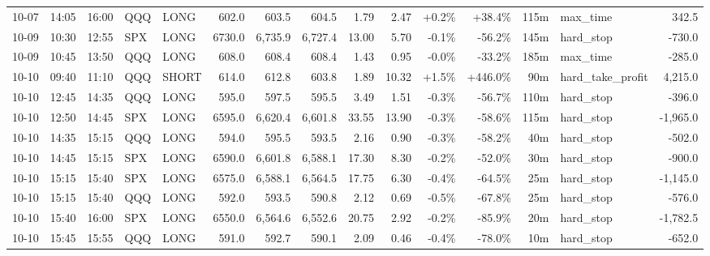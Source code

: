 \documentclass[11pt,a4paper,twoside]{article}
\begin{document}
\begin{landscape}
\begin{center}
\begin{longtable}{>{\color{txtmain}}l l l l l r r r r r r r r >{\color{txtmain}}l r}
10-07 & 14:05 & 16:00 & QQQ & LONG & 602.0 & 603.5 & 604.5 & 1.79 & 2.47 & \textcolor{wingreen}{+0.2\%} & \textcolor{wingreen}{+38.4\%} & 115m & max\_time & \textcolor{wingreen}{342.5} \\
10-09 & 10:30 & 12:55 & SPX & LONG & 6730.0 & 6,735.9 & 6,727.4 & 13.00 & 5.70 & \textcolor{lossred}{-0.1\%} & \textcolor{lossred}{-56.2\%} & 145m & hard\_stop & \textcolor{lossred}{-730.0} \\
10-09 & 10:45 & 13:50 & QQQ & LONG & 608.0 & 608.4 & 608.4 & 1.43 & 0.95 & \textcolor{lossred}{-0.0\%} & \textcolor{lossred}{-33.2\%} & 185m & max\_time & \textcolor{lossred}{-285.0} \\
10-10 & 09:40 & 11:10 & QQQ & SHORT & 614.0 & 612.8 & 603.8 & 1.89 & 10.32 & \textcolor{wingreen}{+1.5\%} & \textcolor{wingreen}{+446.0\%} & 90m & hard\_take\_profit & \textcolor{wingreen}{4,215.0} \\
10-10 & 12:45 & 14:35 & QQQ & LONG & 595.0 & 597.5 & 595.5 & 3.49 & 1.51 & \textcolor{lossred}{-0.3\%} & \textcolor{lossred}{-56.7\%} & 110m & hard\_stop & \textcolor{lossred}{-396.0} \\
10-10 & 12:50 & 14:45 & SPX & LONG & 6595.0 & 6,620.4 & 6,601.8 & 33.55 & 13.90 & \textcolor{lossred}{-0.3\%} & \textcolor{lossred}{-58.6\%} & 115m & hard\_stop & \textcolor{lossred}{-1,965.0} \\
10-10 & 14:35 & 15:15 & QQQ & LONG & 594.0 & 595.5 & 593.5 & 2.16 & 0.90 & \textcolor{lossred}{-0.3\%} & \textcolor{lossred}{-58.2\%} & 40m & hard\_stop & \textcolor{lossred}{-502.0} \\
10-10 & 14:45 & 15:15 & SPX & LONG & 6590.0 & 6,601.8 & 6,588.1 & 17.30 & 8.30 & \textcolor{lossred}{-0.2\%} & \textcolor{lossred}{-52.0\%} & 30m & hard\_stop & \textcolor{lossred}{-900.0} \\
10-10 & 15:15 & 15:40 & SPX & LONG & 6575.0 & 6,588.1 & 6,564.5 & 17.75 & 6.30 & \textcolor{lossred}{-0.4\%} & \textcolor{lossred}{-64.5\%} & 25m & hard\_stop & \textcolor{lossred}{-1,145.0} \\
10-10 & 15:15 & 15:40 & QQQ & LONG & 592.0 & 593.5 & 590.8 & 2.12 & 0.69 & \textcolor{lossred}{-0.5\%} & \textcolor{lossred}{-67.8\%} & 25m & hard\_stop & \textcolor{lossred}{-576.0} \\
10-10 & 15:40 & 16:00 & SPX & LONG & 6550.0 & 6,564.6 & 6,552.6 & 20.75 & 2.92 & \textcolor{lossred}{-0.2\%} & \textcolor{lossred}{-85.9\%} & 20m & hard\_stop & \textcolor{lossred}{-1,782.5} \\
10-10 & 15:45 & 15:55 & QQQ & LONG & 591.0 & 592.7 & 590.1 & 2.09 & 0.46 & \textcolor{lossred}{-0.4\%} & \textcolor{lossred}{-78.0\%} & 10m & hard\_stop & \textcolor{lossred}{-652.0} \\

\end{longtable}
\end{center}
\end{landscape}
\end{document}
